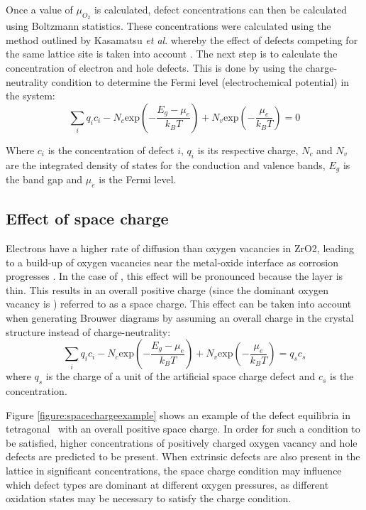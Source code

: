 Once a value of $\mu_{O_2}$ is calculated, defect concentrations can then be calculated using Boltzmann statistics. These concentrations were calculated using the method outlined by Kasamatsu \emph{et al}. whereby the effect of defects competing for the same lattice site is taken into account \cite{Kasamatsu2012}. The next step is to calculate the concentration of electron and hole defects. This is done by using the charge-neutrality condition to determine the Fermi level (electrochemical potential) in the system:
\begin{equation}
\sum_{i}q_{i}c_{i} - N_{c}\textrm{exp}{(-\frac{E_{g}-\mu_{e}}{k_{B}T})} + N_{v}\textrm{exp}{(-\frac{\mu_{e}}{k_{B}T})} = 0
\label{charge_neutrality}
\end{equation}

Where $c_{i}$ is the concentration of defect $i$, $q_{i}$ is its respective charge, $N_{c}$ and $N_{v}$ are the integrated density of states for the conduction and valence bands, $E_{g}$ is the band gap and $\mu_{e}$ is the Fermi level. 

\subsection{Effect of space charge} \label{space_charge}

Electrons have a higher rate of diffusion than oxygen vacancies in ZrO2, leading to a build-up of oxygen vacancies near the metal-oxide interface as corrosion progresses \cite{bojinov2010influence}. In the case of \zirconia , this effect will be pronounced because the layer is thin. This results in an overall positive charge (since the dominant oxygen vacancy is ) referred to as a space charge. This effect can be taken into account when generating Brouwer diagrams by assuming an overall charge in the crystal structure instead of charge-neutrality:
\begin{equation}
\sum_{i}q_{i}c_{i} - N_{c}\textrm{exp}{(-\frac{E_{g}-\mu_{e}}{k_{B}T})} + N_{v}\textrm{exp}{(-\frac{\mu_{e}}{k_{B}T})} = q_{s}c_{s}
\label{charge_non_neutrality}
\end{equation}
where $q_{s}$ is the charge of a unit of the artificial space charge defect and $c_{s}$ is the concentration.

Figure \ref{figure:spacechargeexample} shows an example of the defect equilibria in tetragonal \zirconia\ with an overall positive space charge. In order for such a condition to be satisfied, higher concentrations of positively charged oxygen vacancy and hole defects are predicted to be present. When extrinsic defects are also present in the lattice in significant concentrations, the space charge condition may influence which defect types are dominant at different oxygen pressures, as different oxidation states may be necessary to satisfy the charge condition.


